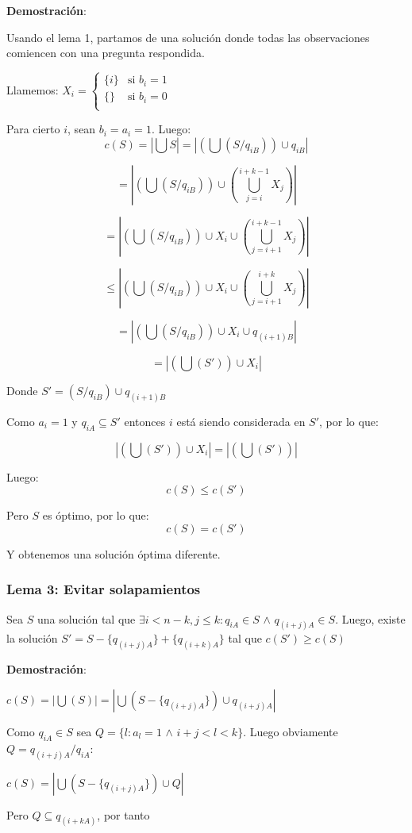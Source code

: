 \documentclass{article}
\begin{document}
\textbf{Demostración}: 

Usando el lema 1, partamos de una solución donde todas las observaciones comiencen con una pregunta respondida.

Llamemos:
$
X_i =
\begin{cases}
\{i\} & \text{si } b_i=1\\
\{\} & \text{si } b_i=0\\
\end{cases}
$

Para cierto $i$, sean $b_i=a_i=1$. Luego:
$$c(S)=|\bigcup S|=|(\bigcup (S/q_{iB}))\cup q_{iB}|$$

$$=|(\bigcup (S/q_{iB}))\cup (\bigcup_{j=i}^{i+k-1} X_j)|$$

$$=|(\bigcup (S/q_{iB}))\cup X_i \cup (\bigcup_{j=i+1}^{i+k-1} X_j)|$$

$$\leq |(\bigcup (S/q_{iB}))\cup X_i \cup (\bigcup_{j=i+1}^{i+k} X_j)|$$

$$= |(\bigcup (S/q_{iB}))\cup X_i \cup q_{(i+1)B}|$$

$$= |(\bigcup (S'))\cup X_i|$$

Donde $S'=(S/q_{iB}) \cup q_{(i+1)B}$

Como $a_i=1$ y $q_{iA} \subseteq S'$ entonces $i$ está siendo considerada en $S'$, por lo que:

$$|(\bigcup (S'))\cup X_i|=|(\bigcup (S'))|$$

Luego:$$c(S)\leq c(S')$$

Pero $S$ es óptimo, por lo que: $$c(S)= c(S')$$

Y obtenemos una solución óptima diferente.

\subsubsection{Lema 3: Evitar solapamientos}

Sea $S$ una solución tal que $\exists i< n-k,j\leq k:q_{iA} \in S$ $\land$ $q_{(i+j)A}\in S$. Luego, existe la solución $S'=S-\{q_{(i+j)A}\} + \{q_{(i+k)A}\}$ tal que $c(S')\geq c(S)$

\textbf{Demostración}: 

$c(S)=|\bigcup (S)|=|\bigcup (S-\{q_{(i+j)A}\})\cup q_{(i+j)A}|$

Como $q_{iA} \in S$ sea $Q=\{l:a_l=1$ $\wedge$ $i+j<l< k\}$. Luego obviamente $Q=q_{(i+j)A}/q_{iA}$:

$c(S)=|\bigcup (S-\{q_{(i+j)A}\})\cup Q|$

Pero $Q\subseteq q_{(i+kA)}$, por tanto
\end{document}
